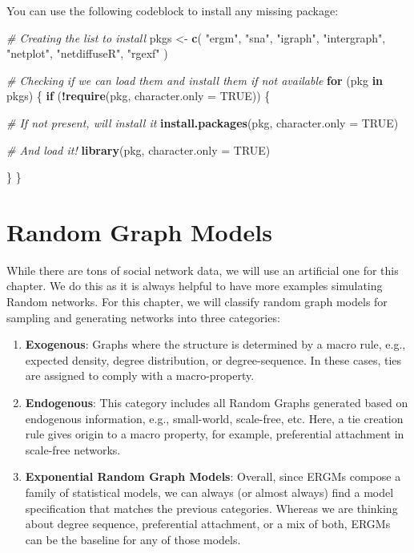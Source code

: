 \documentclass[]{book}
\newenvironment{Shaded}{\begin{snugshade}}{\end{snugshade}}
\newcommand{\CommentTok}[1]{\textcolor[rgb]{0.56,0.35,0.01}{\textit{#1}}}
\newcommand{\ControlFlowTok}[1]{\textcolor[rgb]{0.13,0.29,0.53}{\textbf{#1}}}
\newcommand{\DataTypeTok}[1]{\textcolor[rgb]{0.13,0.29,0.53}{#1}}
\newcommand{\KeywordTok}[1]{\textcolor[rgb]{0.13,0.29,0.53}{\textbf{#1}}}
\newcommand{\NormalTok}[1]{#1}
\newcommand{\OperatorTok}[1]{\textcolor[rgb]{0.81,0.36,0.00}{\textbf{#1}}}
\newcommand{\OtherTok}[1]{\textcolor[rgb]{0.56,0.35,0.01}{#1}}
\newcommand{\StringTok}[1]{\textcolor[rgb]{0.31,0.60,0.02}{#1}}
\begin{document}
You can use the following codeblock to install any missing package:

\begin{Shaded}
\begin{Highlighting}[]
\CommentTok{# Creating the list to install}
\NormalTok{pkgs <-}\StringTok{ }\KeywordTok{c}\NormalTok{(}
  \StringTok{"ergm"}\NormalTok{, }\StringTok{"sna"}\NormalTok{, }\StringTok{"igraph"}\NormalTok{, }\StringTok{"intergraph"}\NormalTok{, }\StringTok{"netplot"}\NormalTok{, }\StringTok{"netdiffuseR"}\NormalTok{, }\StringTok{"rgexf"}
\NormalTok{  )}

\CommentTok{# Checking if we can load them and install them if not available}
\ControlFlowTok{for}\NormalTok{ (pkg }\ControlFlowTok{in}\NormalTok{ pkgs) \{}
  \ControlFlowTok{if}\NormalTok{ (}\OperatorTok{!}\KeywordTok{require}\NormalTok{(pkg, }\DataTypeTok{character.only =} \OtherTok{TRUE}\NormalTok{)) \{}

    \CommentTok{# If not present, will install it}
    \KeywordTok{install.packages}\NormalTok{(pkg, }\DataTypeTok{character.only =} \OtherTok{TRUE}\NormalTok{)}

    \CommentTok{# And load it!}
    \KeywordTok{library}\NormalTok{(pkg, }\DataTypeTok{character.only =} \OtherTok{TRUE}\NormalTok{)}

\NormalTok{  \}}
\NormalTok{\}}
\end{Highlighting}
\end{Shaded}

\hypertarget{random-graph-models}{%
\section{Random Graph Models}\label{random-graph-models}}

While there are tons of social network data, we will use an artificial one for this chapter.
We do this as it is always helpful to have more examples simulating Random
networks. For this chapter, we will classify random graph models for sampling and
generating networks into three categories:

\begin{enumerate}
\def\labelenumi{\arabic{enumi}.}
\item
  \textbf{Exogenous}: Graphs where the structure is determined by a macro rule, e.g.,
  expected density, degree distribution, or degree-sequence. In these cases,
  ties are assigned to comply with a macro-property.
\item
  \textbf{Endogenous}: This category includes all Random Graphs generated based
  on endogenous information, e.g., small-world, scale-free, etc. Here, a tie
  creation rule gives origin to a macro property, for example, preferential attachment
  in scale-free networks.
\item
  \textbf{Exponential Random Graph Models}: Overall, since ERGMs compose a family
  of statistical models, we can always (or almost always) find a model specification
  that matches the previous categories. Whereas we are thinking about degree sequence,
  preferential attachment, or a mix of both, ERGMs can be the baseline for any of
  those models.
\end{enumerate}
\end{document}
